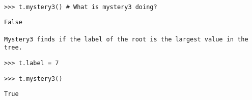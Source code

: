 \begin{blocksection}
\begin{lstlisting}

>>> t.mystery3() # What is mystery3 doing?
\end{lstlisting}
\begin{solution}[.5in]
\begin{lstlisting}
False

Mystery3 finds if the label of the root is the largest value in the tree.
\end{lstlisting}
\end{solution}

\begin{lstlisting}
>>> t.label = 7
\end{lstlisting}

\begin{lstlisting}
>>> t.mystery3()
\end{lstlisting}
\begin{solution}[.5in]
\begin{lstlisting}
True
\end{lstlisting}
\end{solution}

\end{blocksection}
